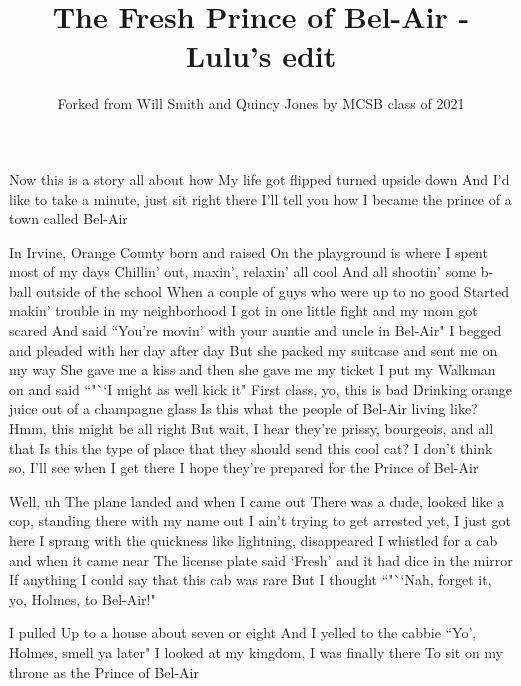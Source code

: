 \documentclass{article}
\title{The Fresh Prince of Bel-Air - Lulu's edit}
\author{Forked from Will Smith and Quincy Jones by MCSB class of 2021}
\begin{document}
\maketitle

Now this is a story all about how
My life got flipped turned upside down
And I'd like to take a minute, just sit right there
I'll tell you how I became the prince of a town called Bel-Air

In Irvine, Orange County born and raised
On the playground is where I spent most of my days
Chillin' out, maxin', relaxin' all cool
And all shootin' some b-ball outside of the school
When a couple of guys who were up to no good
Started makin' trouble in my neighborhood
I got in one little fight and my mom got scared
And said ``You're movin' with your auntie and uncle in Bel-Air"
I begged and pleaded with her day after day
But she packed my suitcase and sent me on my way
She gave me a kiss and then she gave me my ticket
I put my Walkman on and said ``"``I might as well kick it"
First class, yo, this is bad
Drinking orange juice out of a champagne glass
Is this what the people of Bel-Air living like?
Hmm, this might be all right
But wait, I hear they're prissy, bourgeois, and all that
Is this the type of place that they should send this cool cat?
I don't think so, I'll see when I get there
I hope they're prepared for the Prince of Bel-Air

Well, uh
The plane landed and when I came out
There was a dude, looked like a cop, standing there with my name out
I ain't trying to get arrested yet, I just got here
I sprang with the quickness like lightning, disappeared
I whistled for a cab and when it came near
The license plate said `Fresh' and it had dice in the mirror
If anything I could say that this cab was rare
But I thought ``"``Nah, forget it, yo, Holmes, to Bel-Air!"

I pulled
Up to a house about seven or eight
And I yelled to the cabbie ``Yo', Holmes, smell ya later"
I looked at my kingdom, I was finally there
To sit on my throne as the Prince of Bel-Air
\end{document}
